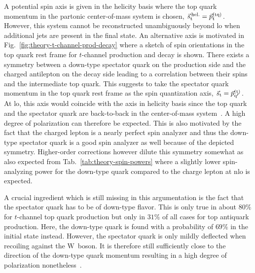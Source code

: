 A potential spin axis is given in the helicity basis where the top quark momentum in the partonic center-of-mass system is chosen, $\vec{s}_\mathrm{t}^\scriptn{\,\mathrm{hel.}}=\vec{p}_\mathrm{t}^\scriptn{\mathrm{(tq)}}$. However, this system cannot be reconstructed unambiguously beyond \gls{lo} when additional jets are present in the final state. An alternative axis is motivated in Fig.~\ref{fig:theory-t-channel-prod-decay} where a sketch of spin orientations in the top quark rest frame for $t$-channel production and decay is shown. There exists a symmetry between a down-type spectator quark on the production side and the charged antilepton on the decay side leading to a correlation between their spins and the intermediate top quark. This suggests to take the spectator quark momentum in the top quark rest frame as the spin quantization axis, $\vec{s}_\mathrm{t}=\vec{p}_{\mathrm{q}^\prime}^\scriptn{\mathrm{(t)}}$. At \gls{lo}, this axis would coincide with the axis in helicity basis since the top quark and the spectator quark are back-to-back in the center-of-mass system~\cite{Schwienhorst:2010je}. A high degree of polarization can therefore be expected. This is also motivated by the fact that the charged lepton is a nearly perfect spin analyzer and thus the down-type spectator quark is a good spin analyzer as well because of the depicted symmetry. Higher-order corrections however dilute this symmetry somewhat as also expected from Tab.~\ref{tab:theory-spin-powers} where a slightly lower spin-analyzing power for the down-type quark compared to the charge lepton at \gls{nlo} is expected. 


A crucial ingredient which is still missing in this argumentation is the fact that the spectator quark has to be of down-type flavor. This is only true in about $80\%$ for $t$-channel top quark production but only in $31\%$ of all cases for top antiquark production. Here, the down-type quark is found with a probability of $69\%$ in the initial state instead. However, the spectator quark is only mildly deflected when recoiling against the $\mathrm{W}$~boson. It is therefore still sufficiently close to the direction of the down-type quark momentum resulting in a high degree of polarization nonetheless~\cite{Bernreuther:2008ju}.

